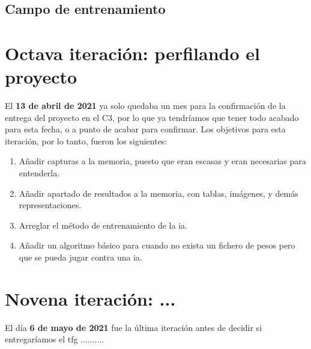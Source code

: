 \subsection{Campo de entrenamiento}

\section{Octava iteración: perfilando el proyecto}
El \textbf{13 de abril de 2021} ya solo quedaba un mes para la confirmación de la entrega del proyecto en el C3, por lo que ya tendríamos que tener todo acabado para esta fecha, o a punto de acabar para confirmar. Los objetivos para esta iteración, por lo tanto, fueron los siguientes:
\begin{enumerate}
	\item Añadir capturas a la memoria, puesto que eran escasas y eran necesarias para entenderla.
	\item Añadir apartado de resultados a la memoria, con tablas, imágenes, y demás representaciones.
	\item Arreglar el método de entrenamiento de la \gls{ia}.
	\item Añadir un algoritmo básico para cuando no exista un fichero de pesos pero que se pueda jugar contra una \gls{ia}.
\end{enumerate}

\section{Novena iteración: ...}
El día \textbf{6 de mayo de 2021} fue la última iteración antes de decidir si entregaríamos el \gls{tfg} ..........